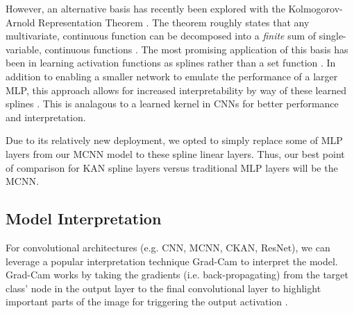 \documentclass[conference]{IEEEtran}
\begin{document}
However, an alternative basis has recently been explored with the Kolmogorov-Arnold Representation Theorem \cite{kan}. The theorem roughly states that any multivariate, continuous function can be decomposed into a \textit{finite} sum of single-variable, continuous functions \cite{kan_approx_thm}. The most promising application of this basis has been in learning activation functions as splines rather than a set function \cite{kan}. In addition to enabling a smaller network to emulate the performance of a larger MLP, this approach allows for increased interpretability by way of these learned splines \cite{kan}. This is analagous to a learned kernel in CNNs for better performance and interpretation.

Due to its relatively new deployment, we opted to simply replace some of MLP layers from our MCNN model to these spline linear layers. Thus, our best point of comparison for KAN spline layers versus traditional MLP layers will be the MCNN.


\subsection{Model Interpretation}
For convolutional architectures (e.g. CNN, MCNN, CKAN, ResNet), we can leverage a popular interpretation technique Grad-Cam to interpret the model. Grad-Cam works by taking the gradients (i.e. back-propagating) from the target class' node in the output layer to the final convolutional layer to highlight important parts of the image for triggering the output activation \cite{gradcam}.
\end{document}
